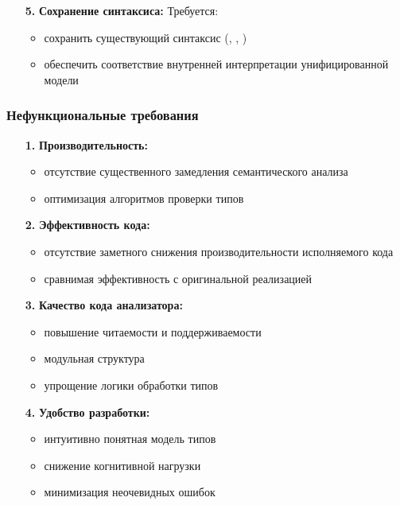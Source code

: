 \begin{enumerate}[leftmargin=*,align=left]
    \item[\textbf{5.}] \textbf{Сохранение синтаксиса:} Требуется:
    \begin{itemize}
        \item сохранить существующий синтаксис (, , )
        \item обеспечить соответствие внутренней интерпретации унифицированной модели
    \end{itemize}
\end{enumerate}

\subsubsection{Нефункциональные требования}
\begin{enumerate}[leftmargin=*,align=left]
    \item[\textbf{1.}] \textbf{Производительность:}
    \begin{itemize}
        \item отсутствие существенного замедления семантического анализа
        \item оптимизация алгоритмов проверки типов
    \end{itemize}

    \item[\textbf{2.}] \textbf{Эффективность кода:}
    \begin{itemize}
        \item отсутствие заметного снижения производительности исполняемого кода
        \item сравнимая эффективность с оригинальной реализацией
    \end{itemize}

    \item[\textbf{3.}] \textbf{Качество кода анализатора:}
    \begin{itemize}
        \item повышение читаемости и поддерживаемости
        \item модульная структура
        \item упрощение логики обработки типов
    \end{itemize}

    \item[\textbf{4.}] \textbf{Удобство разработки:}
    \begin{itemize}
        \item интуитивно понятная модель типов
        \item снижение когнитивной нагрузки
        \item минимизация неочевидных ошибок
    \end{itemize}
\end{enumerate}

